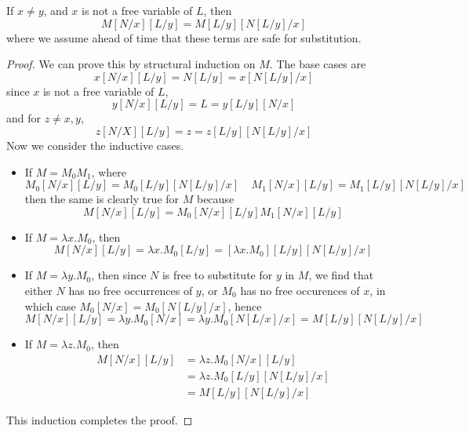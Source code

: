 \begin{lemma}
    If $x \neq y$, and $x$ is not a free variable of $L$, then
    \[ M[N/x][L/y] = M[L/y][N[L/y]/x] \]
    where we assume ahead of time that these terms are safe for substitution.
\end{lemma}
\begin{proof}
    We can prove this by structural induction on $M$. The base cases are
    \[ x[N/x][L/y] = N[L/y] = x[N[L/y]/x] \]
    since $x$ is not a free variable of $L$,
    \[ y[N/x][L/y] = L = y[L/y][N/x] \]
    and for $z \neq x,y$,
    \[ z[N/X][L/y] = z = z[L/y][N[L/y]/x] \]
    Now we consider the inductive cases.
    \begin{itemize}
        \item If $M = M_0 M_1$, where
        \[ M_0[N/x][L/y] = M_0[L/y][N[L/y]/x]\ \ \ \ \ M_1[N/x][L/y] = M_1[L/y][N[L/y]/x] \]
        then the same is clearly true for $M$ because
        \[ M[N/x][L/y] = M_0[N/x][L/y] M_1[N/x][L/y] \]

        \item If $M = \lambda x.M_0$, then
        \[ M[N/x][L/y] = \lambda x.M_0[L/y] = [\lambda x.M_0][L/y][N[L/y]/x] \]

        \item If $M = \lambda y.M_0$, then since $N$ is free to substitute for $y$ in $M$, we find that either $N$ has no free occurrences of $y$, or $M_0$ has no free occurences of $x$, in which case $M_0[N/x] = M_0[N[L/y]/x]$, hence
        \[ M[N/x][L/y] = \lambda y.M_0[N/x] = \lambda y.M_0[N[L/x]/x] = M[L/y][N[L/y]/x] \]

        \item If $M = \lambda z.M_0$, then
        \begin{align*}
            M[N/x][L/y] &= \lambda z.M_0[N/x][L/y]\\
            &= \lambda z.M_0[L/y][N[L/y]/x]\\
            &= M[L/y][N[L/y]/x]
        \end{align*}
    \end{itemize}
    This induction completes the proof.
\end{proof}

